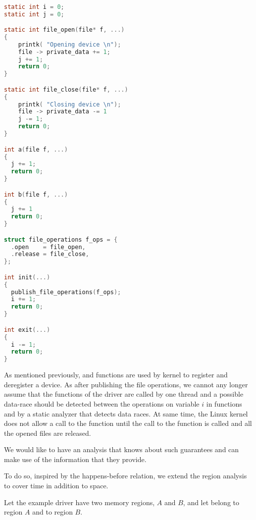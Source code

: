 \documentclass[..thesis.tex]{subfiles}
\begin{document}
\begin{lstlisting}[language=c,style=def]

static int i = 0;
static int j = 0;

static int file_open(file* f, ...)
{
    printk( "Opening device \n");
    file -> private_data += 1;
    j += 1;
    return 0;
}

static int file_close(file* f, ...)
{
    printk( "Closing device \n");
    file -> private_data -= 1
    j -= 1;
    return 0;
}

int a(file f, ...)
{
  j += 1;
  return 0;
}

int b(file f, ...)
{
  j += 1
  return 0;
}

struct file_operations f_ops = {
  .open    = file_open,
  .release = file_close,
};

int init(...)
{
  publish_file_operations(f_ops);
  i += 1;
  return 0;
}

int exit(...)
{
  i -= 1;
  return 0;
}

\end{lstlisting}

As mentioned previously,  and  functions are used by kernel to register and deregister a device.
As after publishing the file operations, we cannot any longer assume that the functions of the driver are called by one thread and
a possible data-race should be detected between the operations on variable $i$ in functions  and  by a static analyzer that detects data races.
At same time, the Linux kernel does not allow a call to the  function until the call to the  function is called and all the opened files are released.

We would like to have an analysis that knows about such guarantees and can make use of the information that they provide.


To do so, inspired by the happens-before relation,  we extend the region analysis to cover time in addition to space.


Let the example driver have two memory regions, $A$ and $B$, and let  belong to region $A$ and  to region $B$.
\end{document}

